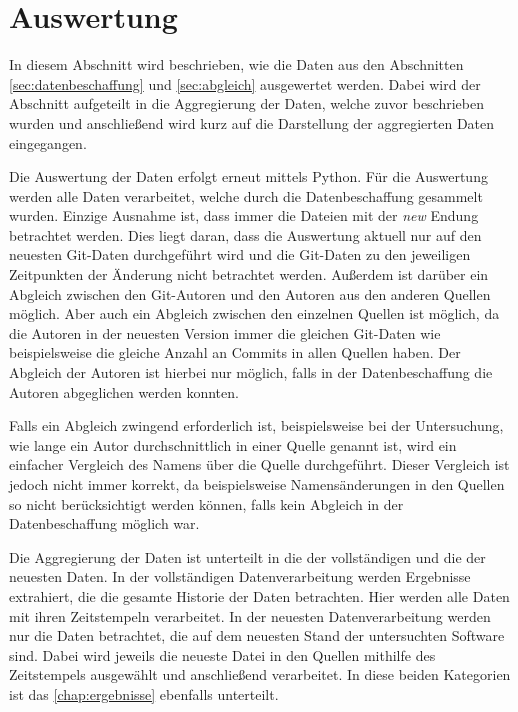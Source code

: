 \section{Auswertung}
\label{sec:auswertung}
In diesem Abschnitt wird beschrieben, wie die Daten aus den Abschnitten \ref{sec:datenbeschaffung} und \ref{sec:abgleich} ausgewertet werden.
Dabei wird der Abschnitt aufgeteilt in die Aggregierung der Daten, welche zuvor beschrieben wurden und anschließend wird kurz auf die Darstellung der aggregierten Daten eingegangen.

Die Auswertung der Daten erfolgt erneut mittels Python.
Für die Auswertung werden alle Daten verarbeitet, welche durch die Datenbeschaffung gesammelt wurden.
Einzige Ausnahme ist, dass immer die Dateien mit der \emph{new} Endung betrachtet werden.
Dies liegt daran, dass die Auswertung aktuell nur auf den neuesten Git-Daten durchgeführt wird und die Git-Daten zu den jeweiligen Zeitpunkten der Änderung nicht betrachtet werden.
Außerdem ist darüber ein Abgleich zwischen den Git-Autoren und den Autoren aus den anderen Quellen möglich.
Aber auch ein Abgleich zwischen den einzelnen Quellen ist möglich, da die Autoren in der neuesten Version immer die gleichen Git-Daten wie beispielsweise die gleiche Anzahl an Commits in allen Quellen haben.
Der Abgleich der Autoren ist hierbei nur möglich, falls in der Datenbeschaffung die Autoren abgeglichen werden konnten.

Falls ein Abgleich zwingend erforderlich ist, beispielsweise bei der Untersuchung, wie lange ein Autor durchschnittlich in einer Quelle genannt ist, wird ein einfacher Vergleich des Namens über die Quelle durchgeführt.
Dieser Vergleich ist jedoch nicht immer korrekt, da beispielsweise Namensänderungen in den Quellen so nicht berücksichtigt werden können, falls kein Abgleich in der Datenbeschaffung möglich war.

Die Aggregierung der Daten ist unterteilt in die der vollständigen und die der neuesten Daten.
In der vollständigen Datenverarbeitung werden Ergebnisse extrahiert, die die gesamte Historie der Daten betrachten.
Hier werden alle Daten mit ihren Zeitstempeln verarbeitet.
In der neuesten Datenverarbeitung werden nur die Daten betrachtet, die auf dem neuesten Stand der untersuchten Software sind.
Dabei wird jeweils die neueste Datei in den Quellen mithilfe des Zeitstempels ausgewählt und anschließend verarbeitet.
In diese beiden Kategorien ist das \autoref{chap:ergebnisse} ebenfalls unterteilt.
